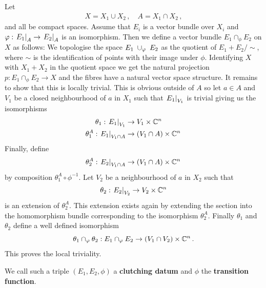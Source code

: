 \begin{definition}
	\label{def:kTheo-gluingAndClutching}
	Let 
	\begin{align*}
		X=X_1 \cup X_2\, , \quad A=X_1 \cap X_2 \, ,
	\end{align*}
	and all be compact spaces. 
	 Assume that $E_i$ is a vector bundle over $X_i$ and $\varphi :\left.E_1\right|_{A} \to \left.E_2\right|_{A}$ is an isomorphism. Then we define a vector bundle $E_1 \cap_{\phi} E_2$ on $X$ as follows:
	 We topologise the space $E_1 \;\cup_{\varphi} \; E_2$ as the quotient of $E_1 + E_2 \slash \sim$, where $\sim$ is the identification of points with their image under $\phi$.
	 Identifying $X$ with $X_1 +X_2 $ in the quotient space we get the natural projection $p:E_1 \cap_{\phi} E_2 \to X$ and the fibres have a natural vector space structure. It remains to show that this is locally trivial. This is obvious outside of $A$ so let $a\in A$ and $V_1$ be a closed neighbourhood of $a$ in $X_1$ such that $\left.E_1\right|_{V_1}$ is trivial giving us the isomorphisms
	 	\begin{align*}
	 	\theta_1: \left.E_1\right|_{V_1} &\to V_1 \times \mathbb{C}^n \, \\
	 	\theta_1^A: \left.E_1\right|_{V_1\cap A} &\to (V_1\cap A) \times \mathbb{C}^n \,
	 \end{align*}
	 	Finally, define
	 \begin{equation*}
	 	\theta^A_2: \left.E_2\right|_{V_1\cap A}\to (V_1\cap A) \times \mathbb{C}^n \,
	 \end{equation*} by composition $ \theta_1^A \circ \phi^{-1}$. Let $V_2$ be a neighbourhood of $a$ in $X_2$ such that 
	 \begin{align*}
	 	\theta_2:\left.E_2\right|_{V_2}\to V_2 \times \mathbb{C}^n
	 \end{align*} is an extension of $\theta_2^A$. This extension exists again by extending the section into the homomorphism bundle corresponding to the isomorphism $\theta_2^A$. Finally $\theta_1$ and $\theta_2$  define a well defined isomorphism
	 	\begin{equation*}
	 	\theta_1 \cap_{\varphi} \theta _2: E_1 \cap_{\varphi} E_2 \to (V_1 \cap V_2)\times \mathbb{C}^n\, .
	 \end{equation*} This proves the local triviality.
	 
	 We call such a triple $(E_1,E_2,\phi)$ a \textbf{clutching datum} and $\phi$ the \textbf{transition function}.
\end{definition}

